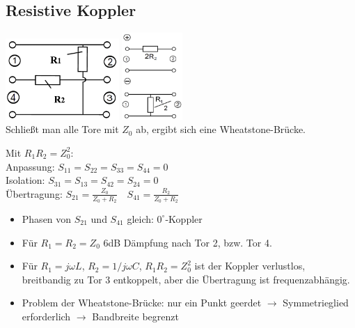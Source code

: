 \documentclass[english]{latex4ei/latex4ei_sheet}
\begin{document}
\begin{sectionbox}
	\subsection{Resistive Koppler}
	\includegraphics[width = 4.3cm]{./img/resistiver_koppler.png}
	\includegraphics[width = 2.3cm]{./img/resistiver_koppler_evenodd.png}\\
	Schließt man alle Tore mit $Z_0$ ab, ergibt sich eine Wheatstone-Brücke.\\
	\begin{emphbox}
		Mit $R_1 R_2 = Z_0^2$:\\
		\vspace{1em}
		Anpassung: $S_{11}=S_{22}=S_{33}=S_{44}=0$\\
		Isolation: $S_{31}=S_{13} = S_{42} = S_{24} =0$\\
		Übertragung: $S_{21}=\frac{Z_{0}}{Z_{0}+R_{2}} \quad S_{41}=\frac{R_{2}}{Z_{0}+R_{2}}$
	\end{emphbox}
	\begin{itemize}
		\item Phasen von $S_{21}$ und $S_{41}$ gleich: $0^{\circ}$-Koppler
		\item Für $R_{1}=R_{2}=Z_{0}$ 6dB Dämpfung nach Tor 2, bzw. Tor 4.
		\item Für $R_1 = j \omega L$, $R_2 = 1 / j \omega C$, $R_1R_2 = Z_0^2$ ist der Koppler verlustlos, breitbandig zu Tor 3 entkoppelt, aber die Übertragung ist frequenzabhängig.
		\item Problem der Wheatstone-Brücke: nur ein Punkt geerdet $\rightarrow$ Symmetrieglied erforderlich $\rightarrow$ Bandbreite begrenzt
	\end{itemize}
\end{sectionbox}
\end{document}
